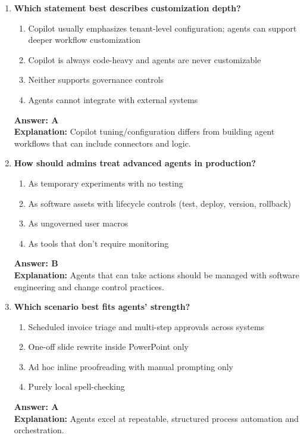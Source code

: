 \documentclass[10pt]{article}
\begin{document}
\begin{enumerate}[leftmargin=*]
\item \textbf{Which statement best describes customization depth?}
\begin{enumerate}[label=\Alph*.]
  \item Copilot usually emphasizes tenant-level configuration; agents can support deeper workflow customization
  \item Copilot is always code-heavy and agents are never customizable
  \item Neither supports governance controls
  \item Agents cannot integrate with external systems
\end{enumerate}
\textbf{Answer: A}\\
\textbf{Explanation:} Copilot tuning/configuration differs from building agent workflows that can include connectors and logic.

\item \textbf{How should admins treat advanced agents in production?}
\begin{enumerate}[label=\Alph*.]
  \item As temporary experiments with no testing
  \item As software assets with lifecycle controls (test, deploy, version, rollback)
  \item As ungoverned user macros
  \item As tools that don’t require monitoring
\end{enumerate}
\textbf{Answer: B}\\
\textbf{Explanation:} Agents that can take actions should be managed with software engineering and change control practices.

\item \textbf{Which scenario best fits agents’ strength?}
\begin{enumerate}[label=\Alph*.]
  \item Scheduled invoice triage and multi-step approvals across systems
  \item One-off slide rewrite inside PowerPoint only
  \item Ad hoc inline proofreading with manual prompting only
  \item Purely local spell-checking
\end{enumerate}
\textbf{Answer: A}\\
\textbf{Explanation:} Agents excel at repeatable, structured process automation and orchestration.


\end{enumerate}
\end{document}
